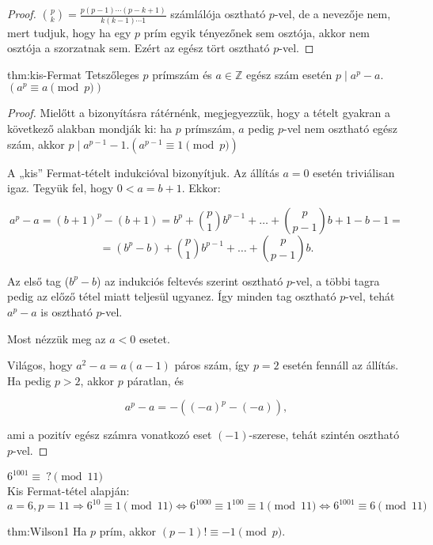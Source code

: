 \begin{proof}
	$\binom{p}{k}=\frac{p(p-1)\cdots(p-k+1)}{k(k-1)\cdots1}$ számlálója
	osztható $p$-vel, de a nevezője nem, mert tudjuk, hogy ha egy $p$
	prím egyik tényezőnek sem osztója, akkor nem osztója a szorzatnak
	sem. Ezért az egész tört osztható $p$-vel. 
\end{proof}
\begin{theorem}{thm:kis-Fermat}
	Tetszőleges $p$ prímszám és $a\in\mathbb{Z}$
	egész szám esetén $p\mid a^{p}-a$. $(a^{p}\equiv a\pmod p)$ 
\end{theorem}

\begin{proof}
	Mielőtt a bizonyításra rátérnénk, megjegyezzük, hogy a tételt gyakran
	a következő alakban mondják ki: ha $p$ prímszám, $a$ pedig $p$-vel
	nem osztható egész szám, akkor $p\mid a^{p-1}-1$.$(a^{p-1}\equiv1\pmod p)$
	
	A „kis” Fermat-tételt indukcióval bizonyítjuk. Az állítás $a=0$ esetén
	triviálisan igaz. Tegyük fel, hogy $0<a=b+1$. Ekkor:
	
	\[
	a^{p}-a=(b+1)^{p}-(b+1)=b^{p}+\binom{p}{1}b^{p-1}+\ldots+\binom{p}{p-1}b+1-b-1=
	\]
	\[
	=(b^{p}-b)+\binom{p}{1}b^{p-1}+\ldots+\binom{p}{p-1}b.
	\]
	
	Az első tag ($b^{p}-b$) az indukciós feltevés szerint osztható $p$-vel,
	a többi tagra pedig az előző tétel miatt teljesül ugyanez. Így minden
	tag osztható $p$-vel, tehát $a^{p}-a$ is osztható $p$-vel.
	
	Most nézzük meg az $a<0$ esetet.
	
	Világos, hogy $a^{2}-a=a(a-1)$ páros szám, így $p=2$ esetén fennáll
	az állítás. Ha pedig $p>2$, akkor $p$ páratlan, és
	
	\[
	a^{p}-a=-(({-a})^{p}-(-a)),
	\]
	
	ami a pozitív egész számra vonatkozó eset $(-1)$-szerese, tehát szintén
	osztható $p$-vel. 
\end{proof}

\begin{example}
	$6^{1001}\equiv\ ?\pmod{11}$\\
	Kis Fermat-tétel alapján: $a=6,p=11\Rightarrow6^{10}\equiv1\pmod{11}\Leftrightarrow6^{1000}\equiv1^{100}\equiv1\pmod{11}\Leftrightarrow6^{1001}\equiv6\pmod{11}$
\end{example}
\begin{theorem}{thm:Wilson1}
	Ha $p$ prím, akkor $(p-1)!\equiv-1\pmod p.$ 
\end{theorem}

